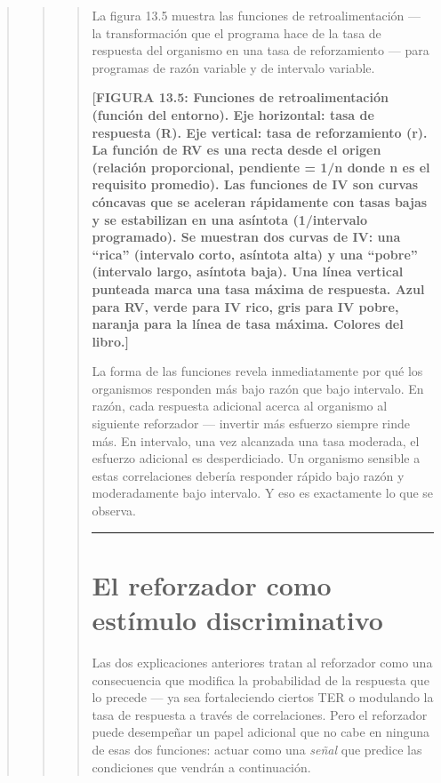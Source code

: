 \documentclass[
  letterpaper,
  DIV=11,
  numbers=noendperiod]{scrreprt}
\begin{document}
\begin{tcolorbox}[enhanced jigsaw, toprule=.15mm, arc=.35mm, colback=white, opacityback=0, colframe=quarto-callout-note-color-frame, breakable, rightrule=.15mm, left=2mm, leftrule=.75mm, bottomrule=.15mm]
\begin{quote}
\begin{quote}
\begin{quote}
La figura 13.5 muestra las funciones de retroalimentación --- la
transformación que el programa hace de la tasa de respuesta del
organismo en una tasa de reforzamiento --- para programas de razón
variable y de intervalo variable.

\textbf{{[}FIGURA 13.5: Funciones de retroalimentación (función del
entorno). Eje horizontal: tasa de respuesta (R). Eje vertical: tasa de
reforzamiento (r). La función de RV es una recta desde el origen
(relación proporcional, pendiente = 1/n donde n es el requisito
promedio). Las funciones de IV son curvas cóncavas que se aceleran
rápidamente con tasas bajas y se estabilizan en una asíntota
(1/intervalo programado). Se muestran dos curvas de IV: una ``rica''
(intervalo corto, asíntota alta) y una ``pobre'' (intervalo largo,
asíntota baja). Una línea vertical punteada marca una tasa máxima de
respuesta. Azul para RV, verde para IV rico, gris para IV pobre, naranja
para la línea de tasa máxima. Colores del libro.{]}}

La forma de las funciones revela inmediatamente por qué los organismos
responden más bajo razón que bajo intervalo. En razón, cada respuesta
adicional acerca al organismo al siguiente reforzador --- invertir más
esfuerzo siempre rinde más. En intervalo, una vez alcanzada una tasa
moderada, el esfuerzo adicional es desperdiciado. Un organismo sensible
a estas correlaciones debería responder rápido bajo razón y
moderadamente bajo intervalo. Y eso es exactamente lo que se observa.

\begin{center}\rule{0.5\linewidth}{0.5pt}\end{center}

\section{El reforzador como estímulo
discriminativo}\label{el-reforzador-como-estuxedmulo-discriminativo}

Las dos explicaciones anteriores tratan al reforzador como una
consecuencia que modifica la probabilidad de la respuesta que lo precede
--- ya sea fortaleciendo ciertos TER o modulando la tasa de respuesta a
través de correlaciones. Pero el reforzador puede desempeñar un papel
adicional que no cabe en ninguna de esas dos funciones: actuar como una
\emph{señal} que predice las condiciones que vendrán a continuación.


\end{quote}
\end{quote}
\end{quote}
\end{tcolorbox}
\end{document}
